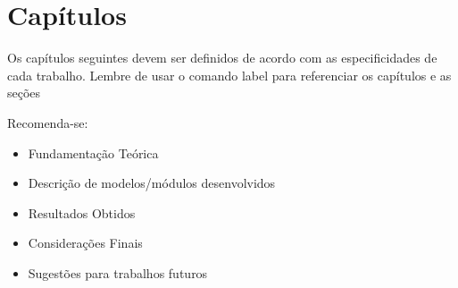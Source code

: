 \chapter{Capítulos}
\label{cap:capitulos}

Os capítulos seguintes devem ser definidos de acordo com as especificidades de cada trabalho. Lembre de usar o comando label para referenciar os capítulos e as seções

Recomenda-se:

\begin{itemize}
  \item Fundamentação Teórica
  \item Descrição de modelos/módulos desenvolvidos
  \item Resultados Obtidos
  \item Considerações Finais
  \item Sugestões para trabalhos futuros
\end{itemize}